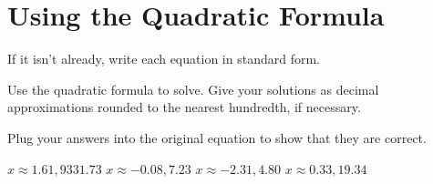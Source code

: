 \section*{Using the Quadratic Formula}
\begin{clist}
\item If it isn't already, write each equation in standard form.
\item Use the quadratic formula to solve.  Give your solutions as decimal approximations rounded to the nearest hundredth, if necessary.
\item Plug your answers into the original equation to show that they are correct.
\end{clist}
\begin{smenum}
\mitemxx
{$x\approx 1.61,9331.73$}
{$x\approx -0.08,7.23$}
\mitemxx
{$x\approx -2.31,4.80$}
{$x\approx 0.33,19.34$}
\end{smenum}

